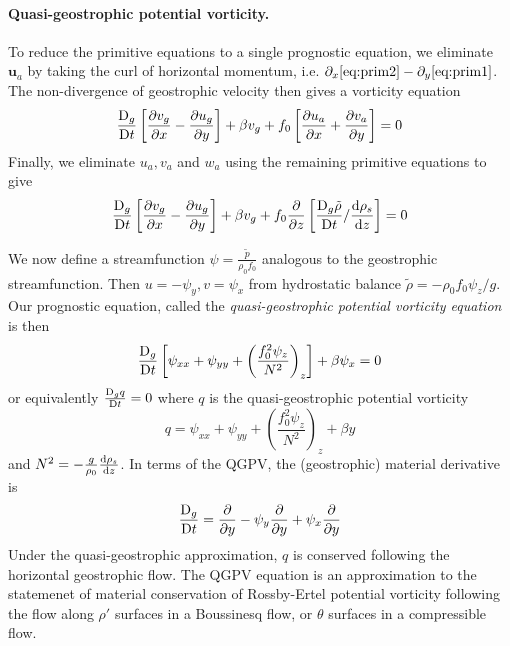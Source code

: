 \documentclass{jknotes}
\begin{document}
\paragraph{Quasi-geostrophic potential vorticity.} 
To reduce the primitive equations to a single
prognostic equation, we eliminate $\symbf{u}_a$ by taking the curl of horizontal
momentum, i.e. $\partial_x \eqref{eq:prim2} - \partial_y \eqref{eq:prim1}$.
The non-divergence of geostrophic velocity then gives a vorticity equation
\begin{equation}
	\frac{\mathrm{D}_g}{\mathrm{D} t} \left[ \frac{\partial v_g}{\partial x} -
		\frac{\partial u_g}{\partial y} \right] + \beta v_g + f_0 \left[
		\frac{\partial u_a}{\partial x} + \frac{\partial v_a}{\partial y}
	\right] = 0
\end{equation}
Finally, we eliminate $u_a, v_a$ and $w_a$ using the remaining primitive
equations to give
\begin{equation}
	\frac{\diffD_g}{\diffD t} \left[ \frac{\partial v_g}{\partial x} -
		\frac{\partial u_g}{\partial y} \right] + \beta v_g +
		f_0\frac{\partial}{\partial z} \left[ \frac{\diffD_g
		\tilde{\rho}}{\diffD t} / \frac{\diffd \rho_s}{\diffd z}\right] = 0
\end{equation}

We now define a streamfunction $\psi = \frac{\tilde{p}}{\rho_0 f_0}$ analogous
to the geostrophic streamfunction. Then $u = -\psi_y, v = \psi_x$ from
hydrostatic balance $\tilde{\rho} = - \rho_0 f_0 \psi_z / g$. Our prognostic
equation, called the \emph{quasi-geostrophic potential vorticity equation} is
then
\begin{equation}
	\frac{\mathrm{D}_g}{\mathrm{D} t} \left[ \psi_{xx} + \psi_{yy} + \left(\frac{f_0^2
	\psi_z}{N^2}\right)_z \right] + \beta \psi_x = 0\label{eq:qgpv}
\end{equation}
or equivalently $\frac{\mathrm{D}_g q}{\mathrm{D} t} = 0$ where $q$ is the
quasi-geostrophic potential vorticity
\begin{equation}
	q = \psi_{xx} + \psi_{yy} + \left( \frac{f_0^2 \psi_z}{N^2}\right)_z +
	\beta y
\end{equation}
and $N^2 = -\frac{g}{\rho_0} \frac{\diffd \rho_s}{\diffd z}$. In terms of the
QGPV, the (geostrophic) material derivative is
\begin{equation}
	\frac{\mathrm{D}_g}{\mathrm{D} t} = \frac{\partial}{\partial y} - \psi_y
	\frac{\partial}{\partial y} + \psi_x \frac{\partial}{\partial y}
\end{equation}
Under the quasi-geostrophic approximation, $q$ is conserved following the
horizontal geostrophic flow. The QGPV equation is an approximation to the
statemenet of material conservation of Rossby-Ertel potential vorticity
following the flow along $\rho'$ surfaces in a Boussinesq flow, or $\theta$
surfaces in a compressible flow.
\end{document}
